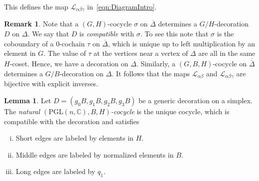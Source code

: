 \documentclass[12pt]{amsart}
\theoremstyle{definition}
\newtheorem{lemma}[theorem]{Lemma}
\newtheorem{remark}[theorem]{Remark}
\numberwithin{equation}{section}
\def\truncsimp{\overline{\Delta}}
\def\dtruncsimp{\overline{\overline{\Delta}}}
\def\PGL{\mathrm{PGL}}
\def\C{\mathbb{C}}
\begin{document}
This defines the map $\mathcal L_{\alpha\beta\gamma}$ in~\eqref{eqn:DiagramIntro}.

\begin{remark}\label{rm:CocycleToDecoration}
Note that a $(G,H)$-cocycle $\sigma$ on $\truncsimp$ determines a $G/H$-decoration $D$ on $\Delta$. We say that $D$ is \emph{compatible} with $\sigma$. To see this note that $\sigma$ is the coboundary of a $0$-cochain $\tau$ on $\truncsimp$, which is unique up to left multiplication by an element in $G$. The value of $\tau$ at the vertices near a vertex of $\Delta$ are all in the same $H$-coset. Hence, we have a decoration on $\Delta$. Similarly, a $(G,B,H)$-cocycle on $\dtruncsimp$ determines a $G/B$-decoration on $\Delta$. It follows that the maps $\mathcal L_{\alpha\beta}$ and $\mathcal L_{\alpha\beta\gamma}$ are bijective with explicit inverses.
\end{remark}

\begin{lemma}\label{lemma:UniversalProperty} Let $D=(g_0B,g_1B,g_2B,g_3B)$ be a generic decoration on a simplex. The \emph{natural $(\PGL(n,\C),B,H)$-cocycle} is the unique 
cocycle, which is compatible with the decoration and satisfies
\begin{enumerate}[(i)]
\item Short edges are labeled by elements in $H$.\label{short}
\item Middle edges are labeled by normalized elements in $B$.\label{middle}
\item Long edges are labeled by $q_1$.\label{long}
\end{enumerate}
\end{lemma}
\end{document}
